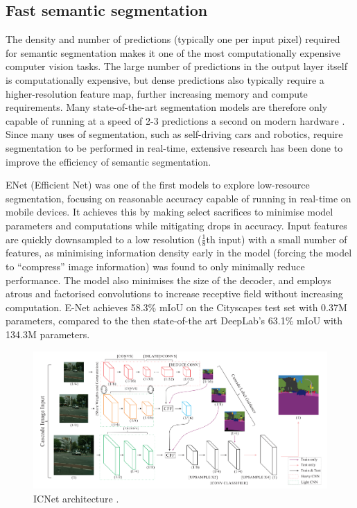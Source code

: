 \documentclass[a4paper,12pt]{report}
\begin{document}
    \subsection{Fast semantic segmentation}
    The density and number of predictions (typically one per input pixel) required for semantic segmentation makes it one of the most computationally expensive computer vision tasks. The large number of predictions in the output layer itself is computationally expensive, but dense predictions also typically require a higher-resolution feature map, further increasing memory and compute requirements. Many state-of-the-art segmentation models are therefore only capable of running at a speed of 2-3 predictions a second on modern hardware \cite{zhao_icnet_2018}. Since many uses of segmentation, such as self-driving cars and robotics, require segmentation to be performed in real-time, extensive research has been done to improve the efficiency of semantic segmentation. 
    
    ENet (Efficient Net) \cite{paszke_enet_2016} was one of the first models to explore low-resource segmentation, focusing on reasonable accuracy capable of running in real-time on mobile devices. It achieves this by making select sacrifices to minimise model parameters and computations while mitigating drops in accuracy. Input features are quickly downsampled to a low resolution ($\frac{1}{8}$th input) with a small number of features, as minimising information density early in the model (forcing the model to “compress” image information) was found to only minimally reduce performance. The model also minimises the size of the decoder, and employs atrous and factorised convolutions to increase receptive field without increasing computation. E-Net achieves 58.3\% mIoU on the Cityscapes test set with 0.37M parameters, compared to the then state-of-the art DeepLab’s 63.1\% mIoU with 134.3M parameters.

    \begin{figure}[t]
        \centering
        \includegraphics[width=\textwidth]{res/icnet-architecture.png}
        \caption{ICNet architecture \cite{zhao_icnet_2018}.}
        \label{fig:icnet_architecture}
    \end{figure}
\end{document}
